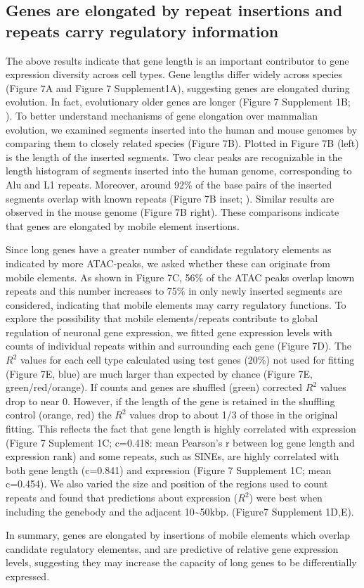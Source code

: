\subsection{Genes are elongated by repeat insertions and repeats carry regulatory information}

The above results indicate that gene length is an important contributor to gene expression diversity across cell types. Gene lengths differ widely across species (Figure 7A and Figure 7 Supplement1A), suggesting genes are elongated during evolution. In fact, evolutionary older genes are longer (Figure 7 Supplement 1B; \cite{Grishkevich_2014}). To better understand mechanisms of gene elongation over mammalian evolution, we examined segments inserted into the human and mouse genomes by comparing them to closely related species (Figure 7B). Plotted in Figure 7B (left) is the length of the inserted segments. Two clear peaks are recognizable in the length histogram of segments inserted into the human genome, corresponding to Alu and L1 repeats. Moreover, around 92\% of the base pairs of the inserted segments overlap with known repeats (Figure 7B inset; \cite{Hubley_2015}). Similar results are observed in the mouse genome (Figure 7B right). These comparisons indicate that genes are elongated by mobile element insertions. 

Since long genes have a greater number of candidate regulatory elements as indicated by more ATAC-peaks, we asked whether these can originate from mobile elements. As shown in Figure 7C, 56\% of the ATAC peaks overlap known repeats and this number increases to 75\% in only newly inserted segments are considered, indicating that mobile elements may carry regulatory functions. To explore the possibility that mobile elements/repeats contribute to global regulation of  neuronal gene expression, we fitted gene expression levels with  counts of individual repeats within  and surrounding each gene (Figure 7D).  The $R^2$ values for each cell type calculated using test genes (20\%) not used for fitting (Figure 7E, blue) are much larger than expected by chance (Figure 7E, green/red/orange). If counts and genes are shuffled (green) corrected $R^2$ values drop to near 0. However, if the length of the gene is retained in the shuffling control (orange, red) the $R^2$ values drop to about 1/3 of those in the original fitting. This reflects the fact that gene length is highly correlated with expression (Figure 7 Suplement 1C; c=0.418: mean Pearson's r between log gene length and expression rank) and some repeats, such as SINEs, are highly correlated with both gene length (c=0.841) and expression (Figure 7 Supplement 1C; mean c=0.454). We also varied the size and position of the regions used to count repeats and found that predictions about expression ($R^2$) were best when including the genebody and the adjacent 10\sim 50kbp. (Figure7 Supplement 1D,E). 

In summary, genes are elongated by insertions of mobile elements which overlap candidate regulatory elementss, and are predictive of relative gene expression levels, suggesting they may increase the capacity of long genes to be differentially expressed. 


